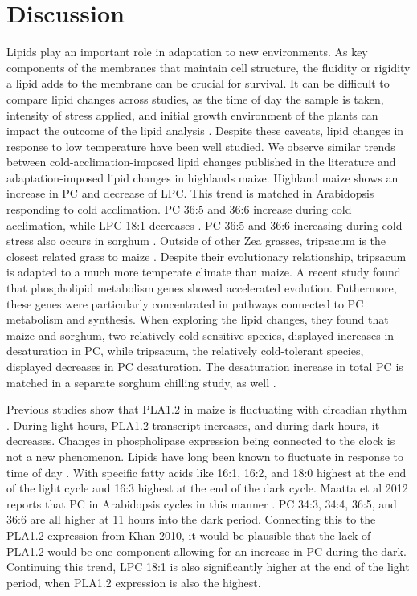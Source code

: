 \documentclass[9pt,twocolumn,twoside]{BioRxiv}
\begin{document}
\section{Discussion}
\label{sec:discusion}
Lipids play an important role in adaptation to new environments. As key components of the membranes that maintain cell structure, the fluidity or rigidity a lipid adds to the membrane can be crucial for survival. It can be difficult to compare lipid changes across studies, as the time of day the sample is taken, intensity of stress applied, and initial growth environment of the plants can impact the outcome of the lipid analysis \cite{Kenchanmane_Raju2018-nz}. Despite these caveats, lipid changes in response to low temperature have been well studied. We observe similar trends between cold-acclimation-imposed lipid changes published in the literature and adaptation-imposed lipid changes in highlands maize. Highland maize shows an increase in PC and decrease of LPC. This trend is matched in Arabidopsis responding to cold acclimation. PC 36:5 and 36:6 increase during cold acclimation, while LPC 18:1 decreases \cite{Welti2002-uk}. PC 36:5 and 36:6 increasing during cold stress also occurs in sorghum \cite{Marla2017-ph}. 
Outside of other Zea grasses, tripsacum is the closest related grass to maize \cite{Yang2013-lg}. Despite their evolutionary relationship, tripsacum is adapted to a much more temperate climate than maize. A recent study found that phospholipid metabolism genes showed accelerated evolution\cite{Yang2013-lg}. Futhermore, these genes were particularly concentrated in pathways connected to PC metabolism and synthesis. When exploring the lipid changes, they found that maize and sorghum, two relatively cold-sensitive species, displayed increases in desaturation in PC, while tripsacum, the relatively cold-tolerant species, displayed decreases in PC desaturation. The desaturation increase in total PC is matched in a separate sorghum chilling study, as well \cite{Marla2017-ph}. 

Previous studies show that PLA1.2 in maize is fluctuating with circadian rhythm \cite{Khan2010-iv}. During light hours, PLA1.2 transcript increases, and during dark hours, it decreases. Changes in phospholipase expression being connected to the clock is not a new phenomenon. Lipids have long been known to fluctuate in response to time of day \cite{Browse1981-vt, Ekman2007-xe}. With specific fatty acids like 16:1, 16:2, and 18:0 highest at the end of the light cycle and 16:3 highest at the end of the dark cycle. Maatta et al 2012 reports that PC in Arabidopsis cycles in this manner \cite{Maatta2012-ip}. PC 34:3, 34:4, 36:5, and 36:6 are all higher at 11 hours into the dark period. Connecting this to the PLA1.2 expression from Khan 2010, it would be plausible that the lack of PLA1.2 would be one component allowing for an increase in PC during the dark. Continuing this trend, LPC 18:1 is also significantly higher at the end of the light period, when PLA1.2 expression is also the highest. 
\end{document}
